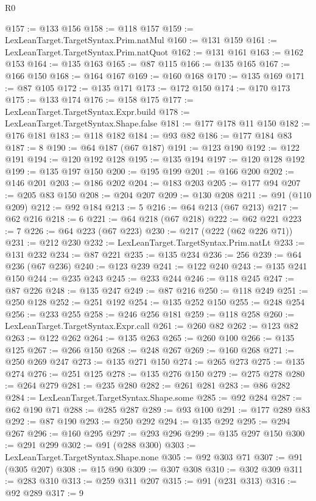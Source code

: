 \begin{lexlean}{R0}
\begin{coremodule}
@157 := @133 @156
@158 := @118 @157
@159 := LexLeanTarget.TargetSyntax.Prim.natMul
@160 := @131 @159
@161 := LexLeanTarget.TargetSyntax.Prim.natQuot
@162 := @131 @161
@163 := @162 @153
@164 := @135 @163
@165 := @87 @115
@166 := @135 @165
@167 := @166 @150
@168 := @164 @167
@169 := @160 @168
@170 := @135 @169
@171 := @87 @105
@172 := @135 @171
@173 := @172 @150
@174 := @170 @173
@175 := @133 @174
@176 := @158 @175
@177 := LexLeanTarget.TargetSyntax.Expr.build
@178 := LexLeanTarget.TargetSyntax.Shape.false
@181 := @177 @178 @11 @150
@182 := @176 @181
@183 := @118 @182
@184 := @93 @82
@186 := @177 @184 @83
@187 := 8
@190 := @64 @187 (@67 @187)
@191 := @123 @190
@192 := @122 @191
@194 := @120 @192 @128
@195 := @135 @194
@197 := @120 @128 @192
@199 := @135 @197 @150
@200 := @195 @199
@201 := @166 @200
@202 := @146 @201
@203 := @186 @202
@204 := @183 @203
@205 := @177 @94
@207 := @205 @83 @150
@208 := @204 @207
@209 := @130 @208
@211 := @91 (@110 @209)
@212 := @92 @184
@213 := 5
@216 := @64 @213 (@67 @213)
@217 := @62 @216
@218 := 6
@221 := @64 @218 (@67 @218)
@222 := @62 @221
@223 := 7
@226 := @64 @223 (@67 @223)
@230 := @217 (@222 (@62 @226 @71))
@231 := @212 @230
@232 := LexLeanTarget.TargetSyntax.Prim.natLt
@233 := @131 @232
@234 := @87 @221
@235 := @135 @234
@236 := 256
@239 := @64 @236 (@67 @236)
@240 := @123 @239
@241 := @122 @240
@243 := @135 @241 @150
@244 := @235 @243
@245 := @233 @244
@246 := @118 @245
@247 := @87 @226
@248 := @135 @247
@249 := @87 @216
@250 := @118 @249
@251 := @250 @128
@252 := @251 @192
@254 := @135 @252 @150
@255 := @248 @254
@256 := @233 @255
@258 := @246 @256 @181
@259 := @118 @258
@260 := LexLeanTarget.TargetSyntax.Expr.call
@261 := @260 @82
@262 := @123 @82
@263 := @122 @262
@264 := @135 @263
@265 := @260 @100
@266 := @135 @125
@267 := @266 @150
@268 := @248 @267
@269 := @160 @268
@271 := @250 @269 @247
@273 := @135 @271 @150
@274 := @265 @273
@275 := @135 @274
@276 := @251 @125
@278 := @135 @276 @150
@279 := @275 @278
@280 := @264 @279
@281 := @235 @280
@282 := @261 @281
@283 := @86 @282
@284 := LexLeanTarget.TargetSyntax.Shape.some
@285 := @92 @284
@287 := @62 @190 @71
@288 := @285 @287
@289 := @93 @100
@291 := @177 @289 @83
@292 := @87 @190
@293 := @250 @292
@294 := @135 @292
@295 := @294 @267
@296 := @160 @295
@297 := @293 @296
@299 := @135 @297 @150
@300 := @291 @299
@302 := @91 (@288 @300)
@303 := LexLeanTarget.TargetSyntax.Shape.none
@305 := @92 @303 @71
@307 := @91 (@305 @207)
@308 := @15 @90
@309 := @307 @308
@310 := @302 @309
@311 := @283 @310
@313 := @259 @311 @207
@315 := @91 (@231 @313)
@316 := @92 @289
@317 := 9

\end{coremodule}
\end{lexlean}
